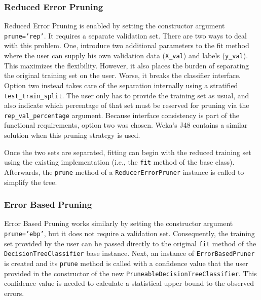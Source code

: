 \subsubsection{Reduced Error Pruning}
Reduced Error Pruning is enabled by setting the constructor argument \texttt{prune='rep'}. It requires a separate validation set. There are two ways to deal with this problem. One, introduce two additional parameters to the fit method where the user can supply his own validation data (\texttt{X\_val}) and labels (\texttt{y\_val}). This maximizes the flexibility. However, it also places the burden of separating the original training set on the user. Worse, it breaks the classifier interface. Option two instead takes care of the separation internally using a stratified \texttt{test\_train\_split}. The user only has to provide the training set as usual, and also indicate which percentage of that set must be reserved for pruning via the \texttt{rep\_val\_percentage} argument. Because interface consistency is part of the functional requirements, option two was chosen. Weka's J48 contains a similar solution when this pruning strategy is used.

Once the two sets are separated, fitting can begin with the reduced training set using the existing implementation (i.e., the \texttt{fit} method of the base class). Afterwards, the \texttt{prune} method of a \texttt{ReducerErrorPruner} instance is called to simplify the tree.

\subsubsection{Error Based Pruning}
Error Based Pruning works similarly by setting the constructor argument \texttt{prune='ebp'}, but it does not require a validation set. Consequently, the training set provided by the user can be passed directly to the original \texttt{fit} method of the \texttt{DecisionTreeClassifier} base instance. Next, an instance of \texttt{ErrorBasedPruner} is created and its \texttt{prune} method is called with a confidence value that the user provided in the constructor of the new \texttt{PruneableDecisionTreeClassifier}. This confidence value is needed to calculate a statistical upper bound to the observed errors.




